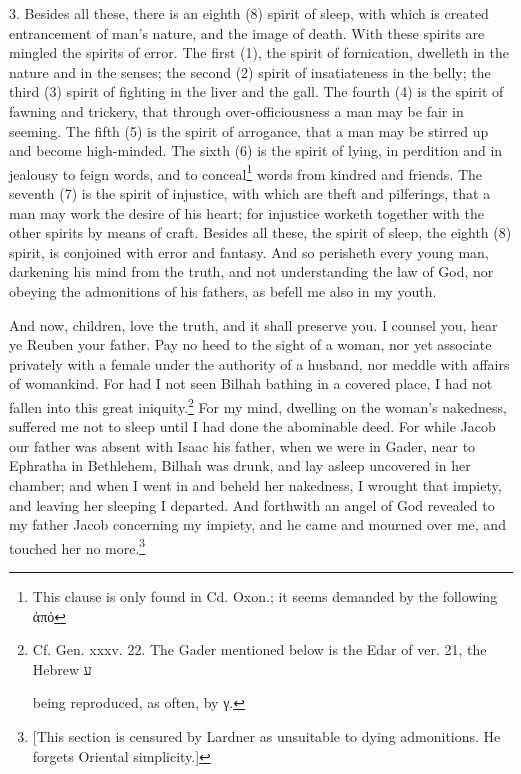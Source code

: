 3. Besides all these, there is an eighth (8) spirit of sleep, with which is created entrancement of man’s nature, and the image of death. With these spirits are mingled the spirits of error. The first (1), the spirit of fornication, dwelleth in the nature and in the senses; the second (2) spirit of insatiateness in the belly; the third (3) spirit of fighting in the liver and the gall. The fourth (4) is the spirit of fawning and trickery, that through over-officiousness a man may be fair in seeming. The fifth (5) is the spirit of arrogance, that a man may be stirred up and become high-minded. The sixth (6) is the spirit of lying, in perdition and in jealousy to feign words, and to conceal\footnote{This clause is only found in Cd. Oxon.; it seems demanded by the following \textgreek{ἀπό}} words from kindred and friends. The seventh (7) is the spirit of injustice, with which are theft and pilferings, that a man may work the desire of his heart; for injustice worketh together with the other spirits by means of craft. Besides all these, the spirit of sleep, the eighth (8) spirit, is conjoined with error and fantasy. And so perisheth every young man, darkening his mind from the truth, and not understanding the law of God, nor obeying the admonitions of his fathers, as befell me also in my youth.

And now, children, love the truth, and it shall preserve you. I counsel you, hear ye Reuben your father. Pay no heed to the sight of a woman, nor yet associate privately with a female under the authority of a husband, nor meddle with affairs of womankind. For had I not seen Bilhah bathing in a covered place, I had not fallen into this great iniquity.\footnote{Cf. Gen. xxxv. 22. The Gader mentioned below is the Edar of ver. 21, the Hebrew \texthebrew{ע }\par  being reproduced, as often, by \textgreek{γ}.} For my mind, dwelling on the woman’s nakedness, suffered me not to sleep until I had done the abominable deed. For while Jacob our father was absent with Isaac his father, when we were in Gader, near to Ephratha in Bethlehem, Bilhah was drunk, and lay asleep uncovered in her chamber; and when I went in and beheld her nakedness, I wrought that impiety, and leaving her sleeping I departed. And forthwith an angel of God revealed to my father Jacob concerning my impiety, and he came and mourned over me, and touched her no more.\footnote{[This section is censured by Lardner as unsuitable to dying admonitions. He forgets Oriental simplicity.]}


